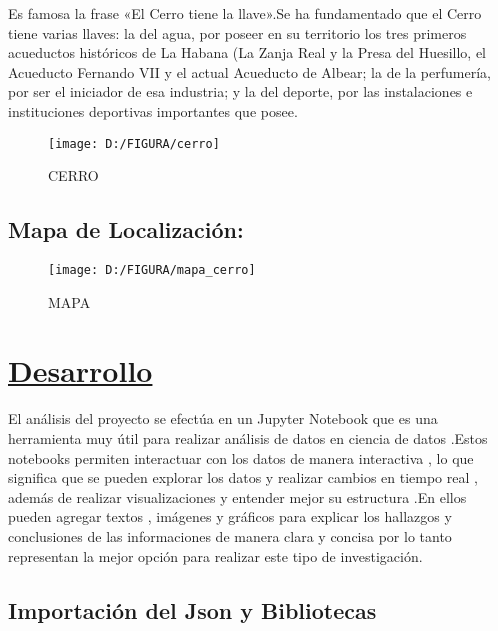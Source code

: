 \documentclass[twocolumn,12pt]{article}
\begin{document}
Es famosa la frase «El Cerro tiene la llave».Se ha fundamentado que el Cerro tiene varias llaves: la del agua, por poseer en su territorio los tres primeros acueductos históricos de La Habana (La Zanja Real y la Presa del Huesillo, el Acueducto Fernando VII y el actual Acueducto de Albear; la de la perfumería, por ser el iniciador de esa industria; y la del deporte, por las instalaciones e instituciones deportivas importantes que posee.


\begin{figure}[h]
	\centering
	\texttt{[image: D:/FIGURA/cerro]}
	\caption{CERRO}
	\label{fig:cerro}
\end{figure}


\subsection{Mapa de Localización:}

\begin{figure}[b]
	\centering
	\texttt{[image: D:/FIGURA/mapa\_cerro]}
	\caption{MAPA}
	\label{fig:mapacerro}
\end{figure}


\onecolumn
\section{{\LARGE \underline{Desarrollo}}}

El análisis del proyecto se efectúa en un Jupyter Notebook que es una herramienta muy útil para realizar análisis de datos en ciencia de datos .Estos  notebooks permiten interactuar con los datos de manera interactiva , lo que significa que se pueden explorar los datos y realizar cambios en tiempo real , además de realizar visualizaciones y entender mejor su estructura .En ellos pueden agregar textos , imágenes y gráficos para explicar los hallazgos y conclusiones de las informaciones de manera clara y concisa por lo tanto representan la mejor opción para realizar este tipo de investigación.

\subsection{Importación del Json y Bibliotecas}
\end{document}
